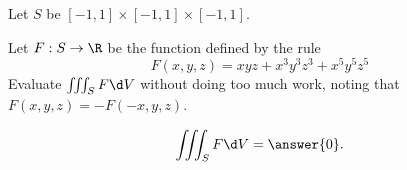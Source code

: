 \documentclass{ximera}
\author{Jim Fowler}
\begin{document}
\begin{exercise}
  Let $S$ be $[-1,1] \times [-1,1] \times [-1,1]$.
  
  Let $F : S \to \R$ be the function defined by the rule
  \[
    F(x,y,z) = xyz + x^3 y^3 z^3 + x^5 y^5 z^5
  \]
  Evaluate $\iiint_S F \d V$ without doing too much work, noting that $F(x,y,z) = - F(-x,y,z)$.
  
  \begin{prompt}
    \[
      \iiint_S F \d V = \answer{0}.
    \]
  \end{prompt}
\end{exercise}
\end{document}

